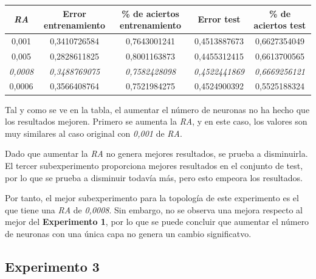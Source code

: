 \documentclass{uc3mpracticas}
\begin{document}
\begin{center}
  \begin{tabular}{|c|c|c|c|c|}
    \hline
    \rowcolor{Gray}
        \textit{\textbf{RA}}  & \textbf{Error entrenamiento} & \textbf{\% de aciertos entrenamiento} & \textbf{Error test} & \textbf{\% de aciertos test}\\ \hline
        0,001                 &  0,3410726584                &  0,7643001241                         &  0,4513887673       &  0,6627354049               \\ \hline
        0,005                 &  0,2828611825                &  0,8001163873                         &  0,4455312415       &  0,6613700565               \\ \hline
        \rowcolor{LightGreen}
        \textit{0,0008}       &  \textit{0,3488769075}       &  \textit{0,7582428098}                &  \textit{0,4522441869}&  \textit{0,6669256121}               \\ \hline
        0,0006                &  0,3566408764                &  0,7521984275                         &  0,4524900392       &  0,5525188324               \\ \hline

  \end{tabular}
\end{center}

Tal y como se ve en la tabla, el aumentar el número de neuronas no ha hecho que los resultados mejoren. Primero se aumenta la \textit{RA}, y en este caso, los valores son muy similares al caso original con \textit{0,001} de \textit{RA}.

\vspace{2mm}

Dado que aumentar la \textit{RA} no genera mejores resultados, se prueba a disminuirla. El tercer subexperimento proporciona mejores resultados en el conjunto de test, por lo que se prueba a disminuir todavía más, pero esto empeora los resultados.

\vspace{1mm}

Por tanto, el mejor subexperimento para la topología de este experimento es el que tiene una \textit{RA} de \textit{0,0008}. Sin embargo, no se observa una mejora respecto al mejor del \textbf{Experimento 1}, por lo que se puede concluir que aumentar el número de neuronas con una única capa no genera un cambio significatvo.


\subsection{Experimento 3}
\end{document}
